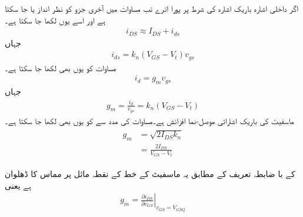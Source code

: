 اگر داخلی اشارہ باریک اشارہ کی شرط پر پورا  اترے تب مساوات  میں آخری جزو کو نظر انداز یا جا سکتا ہے اور اسے یوں لکھا جا سکتا ہے۔
\begin{align} \label{مساوات_میدانی_یکسمتی_اور_بدلتی_رو}
i_{DS} \approx I_{DS} +i_{ds}
\end{align}
جہاں
\begin{align} \label{مساوات_میدانی_باریک_رو_الف}
i_{ds}=k_n \left(V_{GS}-V_t \right )v_{gs}
\end{align}
مساوات   کو یوں بھی لکھا جا سکتا ہے۔
\begin{align} \label{مساوات_میدانی_خارجی_رو_بالمقابل_داخلی_دباو}
i_d=g_m v_{gs}
\end{align}
جہاں
\begin{align} \label{مساوات_میدانی_موصلیت_نما_بطور_افزائش}
g_m =\frac{i_d}{v_{gs}}=k_n \left(V_{GS}-V_t \right )
\end{align}
ماسفیٹ کی باریک اشاراتی موصل-نما افزائش ہے۔مساوات  کی مدد سے  کو یوں بھی لکھا جا سکتا ہے۔
\begin{gather}
\begin{aligned}\label{مساوات_ماسفیٹ_باریک_افزائش_کے_مختلف_مساوات}
g_m&=\sqrt{2 I_{DS} k_n}\\
&=\frac{2 I_{DS}}{V_{GS}-V_t}
\end{aligned}
\end{gather}

 کے با ضابطہ تعریف کے مطابق یہ ماسفیٹ کے   خط کے نقطہ مائل پر مماس کا ڈھلوان ہے یعنی
\begin{align}\label{مساوات_ماسفیٹ_افزائش_کا_جزوی_تفرق_سے_حصول}
g_m =\left. \frac{\partial i_{DS}}{\partial v_{GS}} \right |_{v_{GS}=V_{GSQ}}
\end{align}

